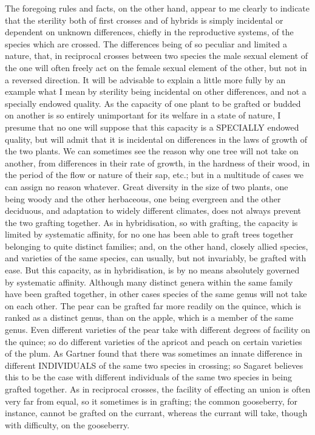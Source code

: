 The foregoing rules and facts, on the other hand, appear to me clearly to indicate that the sterility both of first crosses and of hybrids is simply incidental or dependent on unknown differences, chiefly in the reproductive systems, of the species which are crossed. The differences being of so peculiar and limited a nature, that, in reciprocal crosses between two species the male sexual element of the one will often freely act on the female sexual element of the other, but not in a reversed direction. It will be advisable to explain a little more fully by an example what I mean by sterility being incidental on other differences, and not a specially endowed quality. As the capacity of one plant to be grafted or budded on another is so entirely unimportant for its welfare in a state of nature, I presume that no one will suppose that this capacity is a SPECIALLY endowed quality, but will admit that it is incidental on differences in the laws of growth of the two plants. We can sometimes see the reason why one tree will not take on another, from differences in their rate of growth, in the hardness of their wood, in the period of the flow or nature of their sap, etc.; but in a multitude of cases we can assign no reason whatever. Great diversity in the size of two plants, one being woody and the other herbaceous, one being evergreen and the other deciduous, and adaptation to widely different climates, does not always prevent the two grafting together. As in hybridisation, so with grafting, the capacity is limited by systematic affinity, for no one has been able to graft trees together belonging to quite distinct families; and, on the other hand, closely allied species, and varieties of the same species, can usually, but not invariably, be grafted with ease. But this capacity, as in hybridisation, is by no means absolutely governed by systematic affinity. Although many distinct genera within the same family have been grafted together, in other cases species of the same genus will not take on each other. The pear can be grafted far more readily on the quince, which is ranked as a distinct genus, than on the apple, which is a member of the same genus. Even different varieties of the pear take with different degrees of facility on the quince; so do different varieties of the apricot and peach on certain varieties of the plum.
As Gartner found that there was sometimes an innate difference in different INDIVIDUALS of the same two species in crossing; so Sagaret believes this to be the case with different individuals of the same two species in being grafted together. As in reciprocal crosses, the facility of effecting an union is often very far from equal, so it sometimes is in grafting; the common gooseberry, for instance, cannot be grafted on the currant, whereas the currant will take, though with difficulty, on the gooseberry.
